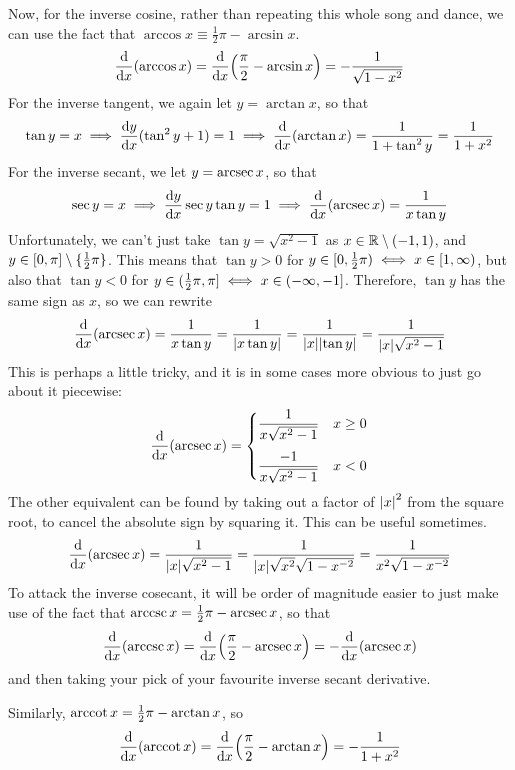 Now, for the inverse cosine, rather than repeating this whole song and
dance, we can use the fact that
\(\arccos x \equiv \frac 12 \pi - \arcsin x\).
\begin{equation*}
\dv{x}(\arccos x) = \dv{x}(\frac \pi 2 - \arcsin x)
    = -\frac 1{\sqrt{1 - x^2}}
\end{equation*}
For the inverse tangent, we again let \(y = \arctan x\), so that
\begin{equation*}
\tan y = x \implies \dv{y}{x} {(\tan^2 y + 1)} = 1
    \implies \dv{x}(\arctan x) = \frac 1{1 + \tan^2 y}
        = \frac 1{1 + x^2}
\end{equation*}
For the inverse secant, we let \(y = \arcsec x\), so that
\begin{equation*}
\sec y = x \implies \dv{y}{x} \sec y \tan y = 1
    \implies \dv{x}(\arcsec x) = \frac 1{x \tan y}
\end{equation*}
Unfortunately, we can't just take \(\tan y = \sqrt{x^2 - 1}\) as
\(x \in \mathbb R \setminus (-1, 1)\), and
\(y \in [0, \pi] \setminus \{\frac 12 \pi\}\). This means that
\(\tan y > 0\) for
\(y \in [0, \frac 12 \pi) \iff x \in [1, \infty)\), but also
that \(\tan y < 0\) for
\(y \in (\frac 12 \pi, \pi] \iff x \in (-\infty, -1]\).
Therefore, \(\tan y\) has the same sign as \(x\), so we can rewrite
\begin{equation*}
\dv{x}(\arcsec x) = \frac 1{x \tan y} = \frac 1{\abs{x \tan y}}
    = \frac 1{\abs{x}\abs{\tan y}} = \frac 1{\abs{x}\sqrt{x^2 - 1}}
\end{equation*}
This is perhaps a little tricky, and it is in some cases more obvious to
just go about it piecewise:
\begin{equation*}
\dv{x}(\arcsec x) = \begin{cases}
    \dfrac 1{x\sqrt{x^2 - 1}} & x \ge 0 \\[3ex]
    \dfrac {-1}{x\sqrt{x^2 - 1}} & x < 0
\end{cases}
\end{equation*}
The other equivalent can be found by taking out a factor of \(\abs{x}^2\)
from the square root, to cancel the absolute sign by squaring it. This can
be useful sometimes.
\begin{equation*}
\dv{x}(\arcsec x) = \frac 1{\abs{x}\sqrt{x^2 - 1}}
    = \frac 1{\abs{x}\sqrt{x^2}\sqrt{1 - x^{-2}}}
    = \frac 1{x^2\sqrt{1 - x^{-2}}}
\end{equation*}
To attack the inverse cosecant, it will be order of magnitude easier to just
make use of the fact that \(\arccsc x = \frac 12 \pi - \arcsec x\),
so that
\begin{equation*}
\dv{x}(\arccsc x) = \dv{x}(\frac \pi 2 - \arcsec x) = -\dv{x}(\arcsec x)
\end{equation*}
and then taking your pick of your favourite inverse secant derivative.

Similarly, \(\arccot x = \frac 12 \pi - \arctan x\), so
\begin{equation*}
\dv{x}(\arccot x) = \dv{x}(\frac \pi 2 - \arctan x) = -\frac{1}{1 + x^2}
\end{equation*}
